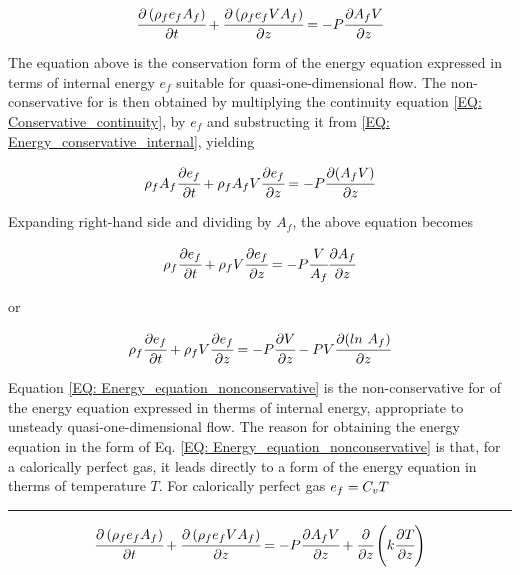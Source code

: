 \documentclass[../Article_Model_Parameters.tex]{subfiles}
\begin{document}
	{\footnotesize
		\begin{equation}
			\cfrac{\partial \left( \rho_f e_f A_f \right) }{\partial t} + \cfrac{\partial \left( \rho_f  e_f V A_f \right)}{\partial z} = -P \cfrac{\partial A_f V}{\partial z}
			\label{EQ: Energy_conservative_internal}
		\end{equation}
	}
	
	The equation above is the conservation form of the energy equation expressed in terms of internal energy $e_f$ suitable for quasi-one-dimensional flow. The non-conservative for is then obtained by multiplying the continuity equation \ref{EQ: Conservative_continuity}, by $e_f$ and substructing it from \ref{EQ: Energy_conservative_internal}, yielding 
	
	{\footnotesize
		\begin{equation}
			\rho_f A_f \cfrac{\partial e_f}{\partial t} + \rho_f A_f V \cfrac{\partial e_f}{\partial z} = - P \cfrac{\partial (A_f V) }{\partial z}
		\end{equation}
	}
	
	Expanding right-hand side and dividing by $A_f$, the above equation becomes 
	
	{\footnotesize
		\begin{equation}
			\rho_f \cfrac{\partial e_f}{\partial t} + \rho_f V \cfrac{\partial e_f}{\partial z} = -P \cfrac{V}{A_f} \cfrac{\partial A_f}{\partial z}
		\end{equation}
	}

	or
	
	{\footnotesize
		\begin{equation}
			\rho_f \cfrac{\partial e_f}{\partial t} + \rho_f V \cfrac{\partial e_f}{\partial z} = -P \cfrac{\partial V}{\partial z} - P V \cfrac{\partial (ln~A_f)}{\partial z}
			\label{EQ: Energy_equation_nonconservative}
		\end{equation}
	}
	
	Equation \ref{EQ: Energy_equation_nonconservative} is the non-conservative for of the energy equation expressed in therms of internal energy, appropriate to unsteady quasi-one-dimensional flow. The reason for obtaining the energy equation in the form of Eq. \ref{EQ: Energy_equation_nonconservative} is that, for a calorically perfect gas, it leads directly to a form of the energy equation in therms of temperature $T$. For calorically perfect gas ${\footnotesize e_f=C_vT}$
	
	\hrule
	
	{\footnotesize
		\begin{equation}
			\cfrac{\partial \left( \rho_f e_f A_f \right) }{\partial t} + \cfrac{\partial \left( \rho_f  e_f V A_f \right)}{\partial z} = -P \cfrac{\partial A_f V}{\partial z} + \cfrac{\partial}{\partial z} \left( k \cfrac{\partial T}{\partial z} \right)
		\end{equation}
	}
	
	
	
	
	
	
	
	
	
	
	
	
	
	
	
\end{document}

